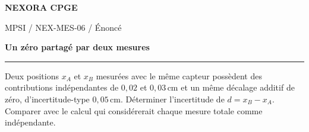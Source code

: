 \documentclass[11pt,a4paper]{article}
\begin{document}
{\small\bfseries\color{nexorablue} NEXORA CPGE}\par
{\small MPSI / NEX-MES-06 / Énoncé}\par
{\LARGE\bfseries Un zéro partagé par deux mesures}\par
\vspace{0.25em}\hrule\vspace{0.6em}

Deux positions $x_A$ et $x_B$ mesurées avec le même capteur possèdent des contributions indépendantes de $0{,}02$ et $0{,}03\,\mathrm{cm}$ et un même décalage additif de zéro, d’incertitude-type $0{,}05\,\mathrm{cm}$. Déterminer l’incertitude de $d=x_B-x_A$. Comparer avec le calcul qui considérerait chaque mesure totale comme indépendante.
\end{document}
